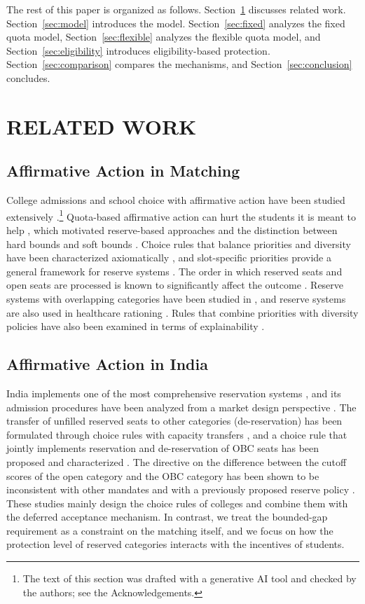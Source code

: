 \documentclass[a4paper,twoside]{article}
\theoremstyle{definition}
\newcommand{\aidraft}{\footnote{The text of this section was drafted with a generative AI tool \cite{Anthropic26a} and checked by the authors; see the Acknowledgements.}}
\begin{document}
The rest of this paper is organized as follows.
Section~\ref{sec:related} discusses related work.
Section~\ref{sec:model} introduces the model.
Section~\ref{sec:fixed} analyzes the fixed quota model,
Section~\ref{sec:flexible} analyzes the flexible quota model, and
Section~\ref{sec:eligibility} introduces eligibility-based protection.
Section~\ref{sec:comparison} compares the mechanisms, and
Section~\ref{sec:conclusion} concludes.

\section{\uppercase{Related Work}}
\label{sec:related}

\subsection{Affirmative Action in Matching}

College admissions and school choice with affirmative action have been studied
extensively \cite{Abdu05a,AbSo03b}.\aidraft{}
Quota-based affirmative action can hurt the students it is meant to help \cite{Koji12a},
which motivated reserve-based approaches \cite{HYY13a} and the distinction between hard
bounds and soft bounds \cite{EHYY14a}.
Choice rules that balance priorities and diversity have been characterized axiomatically
\cite{EcYe15a,imamura2025meritocracy}, and slot-specific priorities provide a general
framework for reserve systems \cite{KoSo16a}.
The order in which reserved seats and open seats are processed is known to
significantly affect the outcome \cite{DKPS18a,DPS20a,PRS23a}.
Reserve systems with overlapping categories have been studied in
\cite{KHIY17a,SoYe22a,AzSu25a}, and reserve systems are also used in healthcare
rationing \cite{PSUY24a,AzBr24a}.
Rules that combine priorities with diversity policies have also been examined in terms of
explainability \cite{arnosti2024explainable}.

\subsection{Affirmative Action in India}

India implements one of the most comprehensive reservation systems
\cite{Gala84a}, and its admission procedures have been analyzed from a market design
perspective \cite{AyTu17a,BCC+19b,SoYe22a}.
The transfer of unfilled reserved seats to other categories (de-reservation) has been
formulated through choice rules with capacity transfers \cite{AyTu20a}, and a choice rule
that jointly implements reservation and de-reservation of OBC seats has been proposed and
characterized \cite{AyTu23a}.
The directive on the difference between the cutoff scores of the open category and the
OBC category has been shown to be inconsistent with other mandates and with a previously
proposed reserve policy \cite{AyTu23b}.
These studies mainly design the choice rules of colleges and combine them with the
deferred acceptance mechanism.
In contrast, we treat the bounded-gap requirement as a constraint on the matching
itself, and we focus on how the protection level of reserved categories interacts with
the incentives of students.
\end{document}
